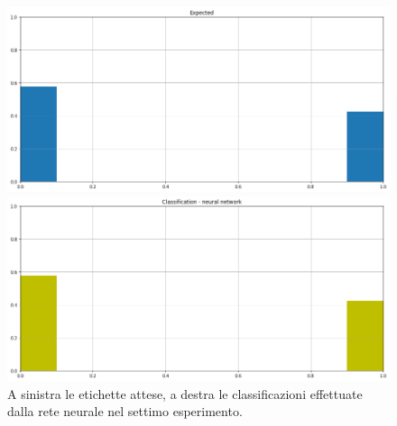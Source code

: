 \documentclass[12pt]{report}
\theoremstyle{definition}
\begin{document}
\begin{figure}
\centering
    \begin{minipage}{0.48\textwidth}
        \includegraphics[width=\linewidth]{images/experiment kaggle/expected_classification.png}
    \end{minipage}
    \begin{minipage}{0.48\textwidth}
        \includegraphics[width=\linewidth]{images/experiment kaggle/prediction_classification_nn.png}
    \end{minipage}
    \caption{A sinistra le etichette attese, a destra le classificazioni effettuate dalla rete neurale nel settimo esperimento.}
    \label{nn_exp7}
\end{figure} 
\end{document}
